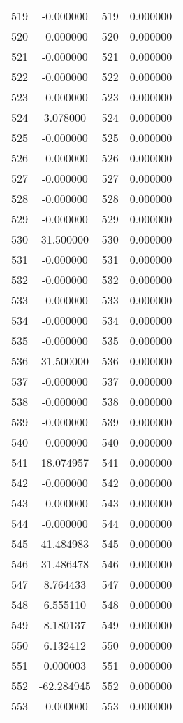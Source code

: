 \documentclass[12pt]{article}
\begin{document}
\begin{longtable}{@{}cccc@{}}
519 & -0.000000 & 519 & 0.000000 \\
520 & -0.000000 & 520 & 0.000000 \\
521 & -0.000000 & 521 & 0.000000 \\
522 & -0.000000 & 522 & 0.000000 \\
523 & -0.000000 & 523 & 0.000000 \\
524 & 3.078000 & 524 & 0.000000 \\
525 & -0.000000 & 525 & 0.000000 \\
526 & -0.000000 & 526 & 0.000000 \\
527 & -0.000000 & 527 & 0.000000 \\
528 & -0.000000 & 528 & 0.000000 \\
529 & -0.000000 & 529 & 0.000000 \\
530 & 31.500000 & 530 & 0.000000 \\
531 & -0.000000 & 531 & 0.000000 \\
532 & -0.000000 & 532 & 0.000000 \\
533 & -0.000000 & 533 & 0.000000 \\
534 & -0.000000 & 534 & 0.000000 \\
535 & -0.000000 & 535 & 0.000000 \\
536 & 31.500000 & 536 & 0.000000 \\
537 & -0.000000 & 537 & 0.000000 \\
538 & -0.000000 & 538 & 0.000000 \\
539 & -0.000000 & 539 & 0.000000 \\
540 & -0.000000 & 540 & 0.000000 \\
541 & 18.074957 & 541 & 0.000000 \\
542 & -0.000000 & 542 & 0.000000 \\
543 & -0.000000 & 543 & 0.000000 \\
544 & -0.000000 & 544 & 0.000000 \\
545 & 41.484983 & 545 & 0.000000 \\
546 & 31.486478 & 546 & 0.000000 \\
547 & 8.764433 & 547 & 0.000000 \\
548 & 6.555110 & 548 & 0.000000 \\
549 & 8.180137 & 549 & 0.000000 \\
550 & 6.132412 & 550 & 0.000000 \\
551 & 0.000003 & 551 & 0.000000 \\
552 & -62.284945 & 552 & 0.000000 \\
553 & -0.000000 & 553 & 0.000000 \\

\end{longtable}
\end{document}
